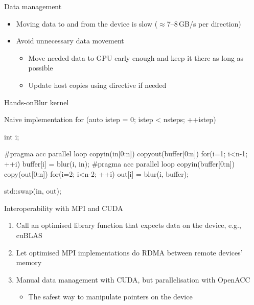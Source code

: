 \documentclass[12pt,aspectratio=169]{beamer}
\begin{document}
\begin{frame}{Data management}
  \begin{itemize}
  \item Moving data to and from the device is slow ($\approx$7--8\,GB/s per direction)
  \item Avoid unnecessary data movement
    \begin{itemize}
    \item Move needed data to GPU early enough and keep it there as long as possible
    \item Update host copies using  directive if needed
    \end{itemize}
  \end{itemize}
\end{frame}

\begin{frame}[fragile]{Hands-on}{Blur kernel}
  \begin{Cpplisting}{Naive implementation}
for (auto istep = 0; istep < nsteps; ++istep) {
    int i;

    #pragma acc parallel loop copyin(in[0:n]) copyout(buffer[0:n])
    for(i=1; i<n-1; ++i) {
        buffer[i] = blur(i, in);
    }
    #pragma acc parallel loop copyin(buffer[0:n]) copy(out[0:n])
    for(i=2; i<n-2; ++i) {
        out[i] = blur(i, buffer);
    }

    std::swap(in, out);
}
  \end{Cpplisting}
\end{frame}

\begin{frame}[fragile]{Interoperability with MPI and CUDA}
  \begin{enumerate}
  \item Call an optimised library function that expects data on the device, e.g., cuBLAS
  \item Let optimised MPI implementations do RDMA between remote devices' memory
  \item Manual data management with CUDA, but parallelisation with OpenACC
    \begin{itemize}
    \item The safest way to manipulate pointers on the device
    \end{itemize}
  \end{enumerate}
\end{frame}
\end{document}
